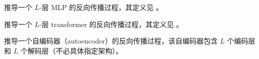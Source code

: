 \documentclass[../../book-main.tex]{subfiles}
\begin{document}
\begin{exercise}
    推导一个 \(L\)-层 MLP 的反向传播过程，其定义见 。
\end{exercise}

\begin{exercise}
    推导一个 \(L\)-层 transformer 的反向传播过程，其定义见 。
\end{exercise}

\begin{exercise}
    推导一个自编码器（autoencoder）的反向传播过程，该自编码器包含 \(L\) 个编码层和 \(L\) 个解码层（不必具体指定架构）。
\end{exercise}
\end{document}
